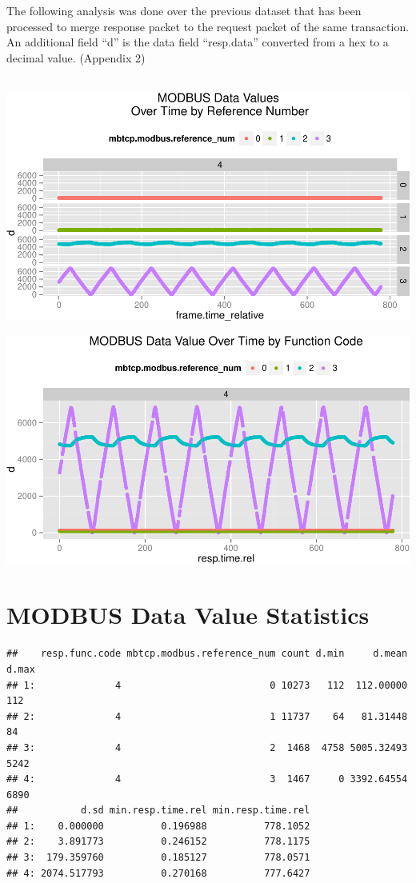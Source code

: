 \documentclass[]{article}
\begin{document}
The following analysis was done over the previous dataset that has been
processed to merge response packet to the request packet of the same
transaction. An additional field ``d'' is the data field ``resp.data''
converted from a hex to a decimal value. (Appendix 2)
~\\\hspace*{0.333em}\\\hspace*{0.333em}

\includegraphics{sew_files/figure-latex/unnamed-chunk-21-1.pdf}

\includegraphics{sew_files/figure-latex/unnamed-chunk-22-1.pdf}

\pagebreak

\section{MODBUS Data Value
Statistics}\label{modbus-data-value-statistics}

\begin{verbatim}
##    resp.func.code mbtcp.modbus.reference_num count d.min     d.mean d.max
## 1:              4                          0 10273   112  112.00000   112
## 2:              4                          1 11737    64   81.31448    84
## 3:              4                          2  1468  4758 5005.32493  5242
## 4:              4                          3  1467     0 3392.64554  6890
##           d.sd min.resp.time.rel min.resp.time.rel
## 1:    0.000000          0.196988          778.1052
## 2:    3.891773          0.246152          778.1175
## 3:  179.359760          0.185127          778.0571
## 4: 2074.517793          0.270168          777.6427
\end{verbatim}
\end{document}
